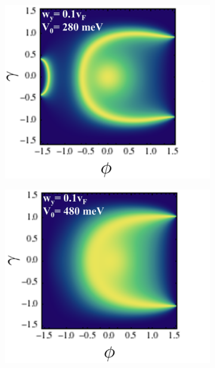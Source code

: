 \begin{figure}[H]
        \begin{subfigure}[b]{0.4\linewidth}
            \includegraphics[width = \linewidth]{fig/Chap 2/anomalous3.png}
            \caption{}
            \label{2fig:anomalous3}
        \end{subfigure}
        \begin{subfigure}[b]{0.4\linewidth}
            \includegraphics[width = \linewidth]{fig/Chap 2/anomalous4.png}
            \caption{}
            \label{2fig:anomalous4}
        \end{subfigure}


\end{figure}
